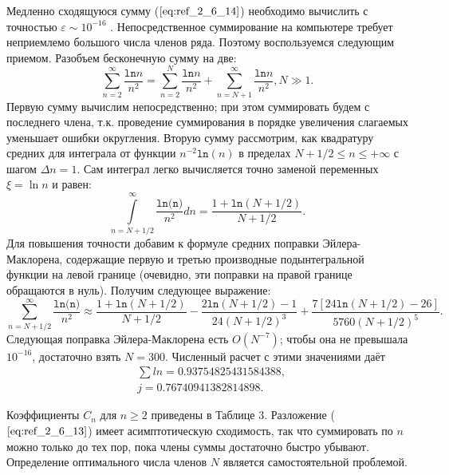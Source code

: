 Медленно сходящуюся сумму ($\ref{eq:ref_2_6_14}$) необходимо вычислить с точностью $\varepsilon \sim 10^{-16}$ .
Непосредственное суммирование на компьютере требует неприемлемо
большого числа членов ряда. Поэтому воспользуемся следующим приемом.
Разобъем бесконечную сумму на две:
\begin{equation}
\sum\limits_{n=2}^{\infty} \frac{\texttt{ln}n}{n^2} = \sum\limits_{n=2}^{N} \frac{\texttt{ln}n}{n^2} + \sum\limits_{n=N+1}^{\infty} \frac{\texttt{ln}n}{n^2}, N \gg 1.
\label{eq:ref_2_6_15}
\end{equation}
Первую сумму вычислим непосредственно; при этом суммировать будем с
последнего члена, т.к. проведение суммирования в порядке увеличения
слагаемых уменьшает ошибки округления. Вторую сумму рассмотрим, как
квадратуру средних для интеграла от функции $n^{-2}\texttt{ln}(n)$ в пределах
$N + 1/ 2 \leqslant n \leqslant +\infty$ с шагом $\Delta n=1$. Сам интеграл легко вычисляется точно
заменой переменных $\xi=\ln n $ и равен:
\begin{equation}
\int\limits_{n=N+1/2}^{\infty} \frac{\texttt{ln(n)}}{n^2} dn = \frac{1+\texttt{ln}(N + 1/2)}{N + 1/2}.
\label{eq:ref_2_6_16}
\end{equation}
Для повышения точности добавим к формуле средних поправки Эйлера-
Маклорена, содержащие первую и третью производные подынтегральной
функции на левой границе (очевидно, эти поправки на правой границе
обращаются в нуль). Получим следующее выражение:
\begin{equation}
\sum\limits_{n=N+1/2}^{\infty} \frac{\texttt{ln(n)}}{n^2} \approx \frac{1+\texttt{ln}(N+1/2)}{N+1/2} - \frac{2\texttt{ln}(N+1/2)-1}{24(N+1/2)^3} + \frac{7[24\texttt{ln}(N+1/2) - 26]}{5760(N+1/2)^5}.
\label{eq:ref_2_6_17}
\end{equation}
Следующая поправка Эйлера-Маклорена есть $O(N^{-7})$; чтобы она не превышала
$10^{-16}$, достаточно взять $N = 300$. Численный расчет с этими значениями даёт
\begin{equation}
\begin{aligned}
&\sum ln = 0.93754825431584388, \\
&j = 0.76740941382814898.
\end{aligned}
\label{eq:ref_2_6_18}
\end{equation}

Коэффициенты $C_n$ для $n \geqslant 2$ приведены в Таблице 3. Разложение ($\ref{eq:ref_2_6_13}$)
имеет асимптотическую сходимость, так что суммировать по $n$ можно только
до тех пор, пока члены суммы достаточно быстро убывают. Определение
оптимального числа членов $N$ является самостоятельной проблемой.
